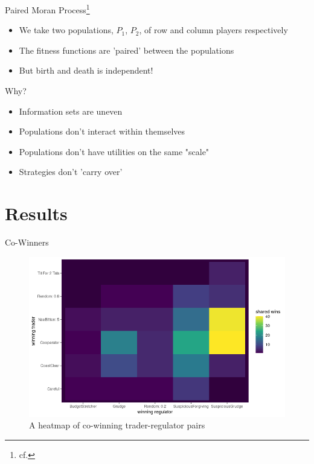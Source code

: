 \documentclass{beamer}
\begin{document}
\begin{frame}{Paired Moran Process\footnote{cf. }}
\begin{itemize}
\item We take two populations, $P_1$, $P_2$, of row and column players respectively
\item The fitness functions are 'paired' between the populations
\item But birth and death is independent!
\end{itemize}
\end{frame}

\begin{frame}{Why?}
\begin{itemize}
    \item Information sets are uneven
    \item Populations don't interact within themselves
    \item Populations don't have utilities on the same "scale"
    \item Strategies don't 'carry over'
\end{itemize}
\end{frame}


\section{Results}
\begin{frame}{Co-Winners}
\begin{figure}[!h]
    \includegraphics[width=\textwidth]{heatmap.png}
    \caption{A heatmap of co-winning trader-regulator pairs}
    \label{fig:f1}
\end{figure}
\end{frame}
\end{document}
